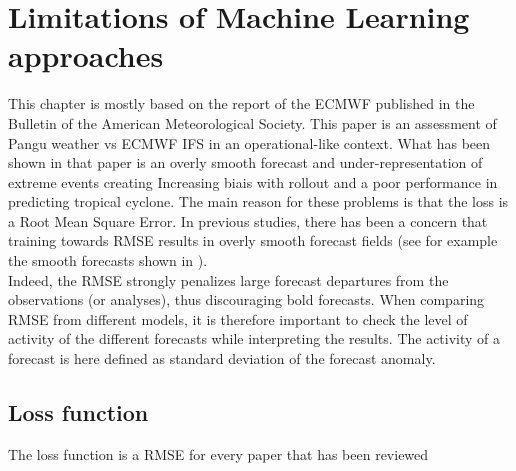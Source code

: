 \chapter{Limitations of Machine Learning approaches}

This chapter is mostly based on the report of the ECMWF \cite{riseofdatadriven} published in the Bulletin of the American Meteorological Society. This paper is an assessment of Pangu weather vs ECMWF IFS in an operational-like context. What has been shown in that paper is an overly smooth forecast and under-representation of extreme events  creating Increasing biais with rollout and a poor performance in predicting tropical cyclone. The main reason for these problems is that the loss is a Root Mean Square Error. In previous studies, there has been a concern that training towards RMSE results in overly smooth forecast fields (see for example the smooth forecasts shown in \cite{keisler}).\\

Indeed, the RMSE strongly penalizes large forecast departures from the observations (or analyses), thus discouraging bold forecasts. When comparing RMSE from different models, it is therefore important to check the level of activity of the different forecasts while interpreting the results. The activity of a forecast is here defined as standard deviation of the forecast anomaly.

\section{Loss function}

The loss function is a RMSE for every paper that has been reviewed 
